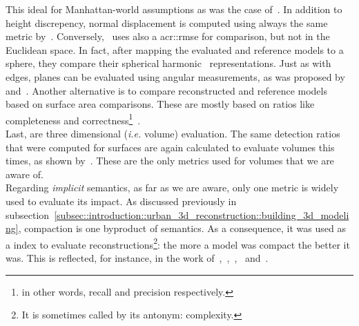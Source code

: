             This ideal for Manhattan-world assumptions as was the case of~\textcite{zebedin2008fusion}.
            In addition to height discrepency, normal displacement is computed using always the same metric by~\textcite{henricsson19973}.
            Conversely,~\textcite{zeng2014multicriteria} uses also a \gls{acr::rmse} for comparison, but not in the Euclidean space.
            In fact, after mapping the evaluated and reference models to a sphere, they compare their spherical harmonic~\parencite{brechbuhler1995parametrization} representations.
            Just as with edges, planes can be evaluated using angular measurements, as was proposed by~\textcite{landes2012quality} and~\textcite{henricsson19973}.
            Another alternative is to compare reconstructed and reference models based on surface area comparisons.
            These are mostly based on ratios like completeness and correctness\footnote{in other words, recall and precision respectively.}~\parencite{rottensteiner2014results,landes2012quality,henricsson19973,schuster2003new}.\\
            Last, are three dimensional (\textit{i.e.} volume) evaluation.
            The same detection ratios that were computed for surfaces are again calculated to evaluate volumes this times, as shown by~\textcite{mohamed2013quality, zeng2014multicriteria,jaynes2003recognition,nguatem2017modeling}.
            These are the only metrics used for volumes that we are aware of.\\

            Regarding \textit{implicit} semantics, as far as we are aware, only one metric is widely used to evaluate its impact.
            As discussed previously in subsection~\ref{subsec::introduction::urban_3d_reconstruction::building_3d_modeling}, compaction is one byproduct of semantics.
            As a consequence, it was used as a index to evaluate reconstructions\footnote{It is sometimes called by its antonym: complexity.}: the more a model was compact the better it was.
            This is reflected, for instance, in the work of~\textcite{lafarge2012creating},~\textcite{zhang2017deep},~\textcite{duan_eccv16},~\textcite{zeng2018neural} and~\textcite{zhu2018large}.

